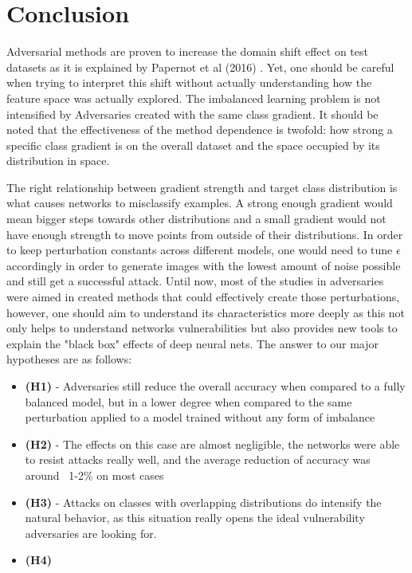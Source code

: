 \chapter{Conclusion}

Adversarial methods are proven to increase the domain shift effect on test datasets as it is explained by Papernot et al (2016) \cite{papernot2016transf}. Yet, one should be careful when trying to interpret this shift without actually understanding how the feature space was actually explored. The imbalanced learning problem is not intensified by Adversaries created with the same class gradient. It should be noted that the effectiveness of the method dependence is twofold: how strong a specific class gradient is on the overall dataset and the space occupied by its distribution in space.

The right relationship between gradient strength and target class distribution is what causes networks to misclassify examples. A strong enough gradient would mean bigger steps towards other distributions and a small gradient would not have enough strength to move points from outside of their distributions. In order to keep perturbation constants across different models, one would need to tune $\epsilon$ accordingly in order to generate images with the lowest amount of noise possible and still get a successful attack. Until now, most of the studies in adversaries were aimed in created methods that could effectively create those perturbations, however, one should aim to understand its characteristics more deeply as this not only helps to understand networks vulnerabilities but also provides new tools to explain the "black box" effects of deep neural nets. The answer to our major hypotheses are as follows:

\begin{itemize}
	\item \textbf{(H1)} - Adversaries still reduce the overall accuracy when compared to a fully balanced model, but in a lower degree when compared to the same perturbation applied to a model trained without any form of imbalance
	\item \textbf{(H2)} - The effects on this case are almost negligible, the networks were able to resist attacks really well, and the average reduction of accuracy was around ~1-2\% on most cases
	\item \textbf{(H3)} - Attacks on classes with overlapping distributions do intensify the natural behavior, as this situation really opens the ideal vulnerability adversaries are looking for.
	\item \textbf{(H4)}
\end{itemize}

